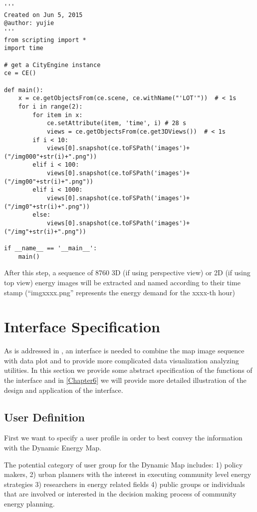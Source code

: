 \makeatletter
\def\verbatim@font{\linespread{1}\tiny\ttfamily} \makeatother
\begin{verbatim}
'''
Created on Jun 5, 2015
@author: yujie
'''
from scripting import *
import time

# get a CityEngine instance
ce = CE()

def main():
    x = ce.getObjectsFrom(ce.scene, ce.withName("'LOT'"))  # < 1s
    for i in range(2):
        for item in x:
            ce.setAttribute(item, 'time', i) # 28 s
            views = ce.getObjectsFrom(ce.get3DViews())  # < 1s
        if i < 10:
            views[0].snapshot(ce.toFSPath('images')+("/img000"+str(i)+".png"))
        elif i < 100:
            views[0].snapshot(ce.toFSPath('images')+("/img00"+str(i)+".png"))
        elif i < 1000:
            views[0].snapshot(ce.toFSPath('images')+("/img0"+str(i)+".png"))
        else:
            views[0].snapshot(ce.toFSPath('images')+("/img"+str(i)+".png"))

if __name__ == '__main__':
    main()
\end{verbatim}
After this step, a sequence of 8760 3D (if using perspective view) or
2D (if using top view) energy images will be extracted and named
according to their time stamp (``imgxxxx.png'' represents the energy
demand for the xxxx-th hour)

\section{Interface Specification}\label{interfaceSpec}
As is addressed in , an interface is needed to
combine the map image sequence with data plot and to provide more
complicated data visualization analyzing utilities. In this section we
provide some abstract specification of the functions of the interface
and in \cref{Chapter6} we will provide more detailed illustration of
the design and application of the interface.

\subsection{User Definition}
First we want to specify a user profile in order to best convey the
information with the Dynamic Energy Map.

The potential category of user group for the Dynamic Map includes: 1)
policy makers, 2) urban planners with the interest in executing
community level energy strategies 3) researchers in energy related
fields 4) public groups or individuals that are involved or interested
in the decision making process of community energy planning.

